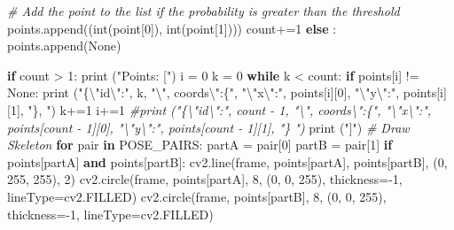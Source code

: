 \documentclass[
  12pt,
  a4paper,
]{article}
\newenvironment{Shaded}{}{}
\newcommand{\BuiltInTok}[1]{#1}
\newcommand{\CharTok}[1]{\textcolor[rgb]{0.25,0.44,0.63}{#1}}
\newcommand{\CommentTok}[1]{\textcolor[rgb]{0.38,0.63,0.69}{\textit{#1}}}
\newcommand{\ControlFlowTok}[1]{\textcolor[rgb]{0.00,0.44,0.13}{\textbf{#1}}}
\newcommand{\DecValTok}[1]{\textcolor[rgb]{0.25,0.63,0.44}{#1}}
\newcommand{\KeywordTok}[1]{\textcolor[rgb]{0.00,0.44,0.13}{\textbf{#1}}}
\newcommand{\NormalTok}[1]{#1}
\newcommand{\OperatorTok}[1]{\textcolor[rgb]{0.40,0.40,0.40}{#1}}
\newcommand{\StringTok}[1]{\textcolor[rgb]{0.25,0.44,0.63}{#1}}
\newcommand{\VariableTok}[1]{\textcolor[rgb]{0.10,0.09,0.49}{#1}}
\begin{document}
\begin{Shaded}
\begin{Highlighting}[numbers=left,,]
        \CommentTok{\# Add the point to the list if the probability is greater than the threshold}
\NormalTok{        points.append((}\BuiltInTok{int}\NormalTok{(point[}\DecValTok{0}\NormalTok{]), }\BuiltInTok{int}\NormalTok{(point[}\DecValTok{1}\NormalTok{])))}
\NormalTok{        count}\OperatorTok{+=}\DecValTok{1}
    \ControlFlowTok{else}\NormalTok{ :}
\NormalTok{        points.append(}\VariableTok{None}\NormalTok{)}

\ControlFlowTok{if}\NormalTok{ count }\OperatorTok{\textgreater{}} \DecValTok{1}\NormalTok{:}
    \BuiltInTok{print}\NormalTok{ (}\StringTok{"Points: ["}\NormalTok{)}
\NormalTok{    i }\OperatorTok{=} \DecValTok{0}
\NormalTok{    k }\OperatorTok{=} \DecValTok{0}
    \ControlFlowTok{while}\NormalTok{ k }\OperatorTok{\textless{}}\NormalTok{ count:}
        \ControlFlowTok{if}\NormalTok{ points[i] }\OperatorTok{!=} \VariableTok{None}\NormalTok{:}
            \BuiltInTok{print}\NormalTok{ (}\StringTok{"\{}\CharTok{\textbackslash{}"}\StringTok{id}\CharTok{\textbackslash{}"}\StringTok{:"}\NormalTok{, k, }\StringTok{"}\CharTok{\textbackslash{}"}\StringTok{, coords}\CharTok{\textbackslash{}"}\StringTok{:\{"}\NormalTok{, }\StringTok{"}\CharTok{\textbackslash{}"}\StringTok{x}\CharTok{\textbackslash{}"}\StringTok{:"}\NormalTok{, points[i][}\DecValTok{0}\NormalTok{], }\StringTok{"}\CharTok{\textbackslash{}"}\StringTok{y}\CharTok{\textbackslash{}"}\StringTok{:"}\NormalTok{, points[i][}\DecValTok{1}\NormalTok{], }\StringTok{"\}, "}\NormalTok{)}
\NormalTok{            k}\OperatorTok{+=}\DecValTok{1}
\NormalTok{        i}\OperatorTok{+=}\DecValTok{1}    
    \CommentTok{\#print ("\{\textbackslash{}"id\textbackslash{}":", count {-} 1, "\textbackslash{}", coords\textbackslash{}":\{", "\textbackslash{}"x\textbackslash{}":", points[count {-} 1][0], "\textbackslash{}"y\textbackslash{}":", points[count {-} 1][1], "\} ")}
    \BuiltInTok{print}\NormalTok{ (}\StringTok{"]"}\NormalTok{)}
\CommentTok{\# Draw Skeleton}
\ControlFlowTok{for}\NormalTok{ pair }\KeywordTok{in}\NormalTok{ POSE\_PAIRS:}
\NormalTok{    partA }\OperatorTok{=}\NormalTok{ pair[}\DecValTok{0}\NormalTok{]}
\NormalTok{    partB }\OperatorTok{=}\NormalTok{ pair[}\DecValTok{1}\NormalTok{]}
    \ControlFlowTok{if}\NormalTok{ points[partA] }\KeywordTok{and}\NormalTok{ points[partB]:}
\NormalTok{        cv2.line(frame, points[partA], points[partB], (}\DecValTok{0}\NormalTok{, }\DecValTok{255}\NormalTok{, }\DecValTok{255}\NormalTok{), }\DecValTok{2}\NormalTok{)}
\NormalTok{        cv2.circle(frame, points[partA], }\DecValTok{8}\NormalTok{, (}\DecValTok{0}\NormalTok{, }\DecValTok{0}\NormalTok{, }\DecValTok{255}\NormalTok{), thickness}\OperatorTok{={-}}\DecValTok{1}\NormalTok{, lineType}\OperatorTok{=}\NormalTok{cv2.FILLED)}
\NormalTok{        cv2.circle(frame, points[partB], }\DecValTok{8}\NormalTok{, (}\DecValTok{0}\NormalTok{, }\DecValTok{0}\NormalTok{, }\DecValTok{255}\NormalTok{), thickness}\OperatorTok{={-}}\DecValTok{1}\NormalTok{, lineType}\OperatorTok{=}\NormalTok{cv2.FILLED)}



\end{Highlighting}
\end{Shaded}
\end{document}
